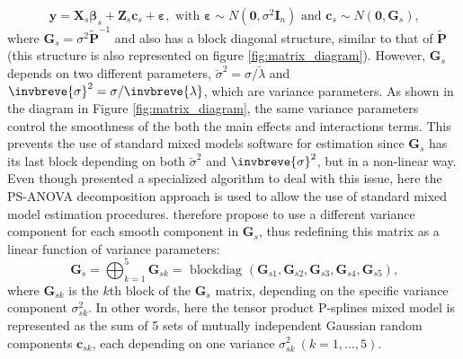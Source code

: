\begin{equation}
    \boldsymbol{y}=\boldsymbol{X}_{s} \boldsymbol{\beta}_{s}+\boldsymbol{Z}_{s} \boldsymbol{c}_{s}+\boldsymbol{\varepsilon}, 	
    \text { with } 
    \boldsymbol{\varepsilon} \sim N\left(\mathbf{0}, \sigma^{2} \boldsymbol{I}_{n}\right) 
    \text { and } 
    \boldsymbol{c}_{s} \sim N\left(\mathbf{0}, \boldsymbol{G}_{s}\right)
    \text{,}
\label{eq:smooth_surface_PS_ANOVA_rewritten}
\end{equation}
where $\boldsymbol{G}_{s} = \sigma^2\widetilde{\boldsymbol{P}}^{-1}$ and also has a block diagonal structure, similar to that of $\widetilde{\boldsymbol{P}}$ (this structure is also represented on 
figure \ref{fig:matrix_diagram}). 
However, $\boldsymbol{G}_{s}$ depends on two different parameters, $\breve{\sigma}^2 =\sigma / \breve{\lambda}$ and $
\invbreve{\sigma}^2 =\sigma / \invbreve{\lambda}$, which are variance parameters. 
As shown in the diagram in Figure \ref{fig:matrix_diagram}, the same variance parameters control the smoothness of the both the 
main effects and interactions terms. 
This prevents the use of standard mixed models software for estimation since $\mathbf{G}_s$ has its last block depending on both 
$\breve{\sigma}^2$ and $\invbreve{\sigma}^2$, but in a non-linear way. 
Even though \textcite{rodriguez-alvarez_fast_2015} presented a specialized algorithm to deal with this issue, 
here the PS-ANOVA decomposition approach \parencite{lee_efficient_2013} is used to allow the use of standard mixed model estimation procedures. \textcite{lee_efficient_2013} therefore propose to use a different variance component for each smooth component in $\mathbf{G}_s$, thus redefining this matrix as a linear function of variance parameters:
\begin{equation}
    \boldsymbol{G}_{s} = 
    \bigoplus_{k=1}^{5} \boldsymbol{G}_{s k}= 
    \text{ blockdiag }
    \left(\boldsymbol{G}_{s 1}, \boldsymbol{G}_{s 2}, \boldsymbol{G}_{s 3}, \boldsymbol{G}_{s 4}, \boldsymbol{G}_{s 5}\right)
    \text{,}
\end{equation}
where $\boldsymbol{G}_{s k}$ %
is the $k$th block of the $\mathbf{G}_{s}$ matrix, depending on the specific variance component $\sigma_{sk}^2$. 
In other words, here the tensor product P-splines mixed model is represented as the sum of 5 sets of mutually independent Gaussian random components $\mathbf{c}_{sk}$, each depending on one variance $\sigma_{sk}^2 \ (k=1,\ldots,5)$.\\

